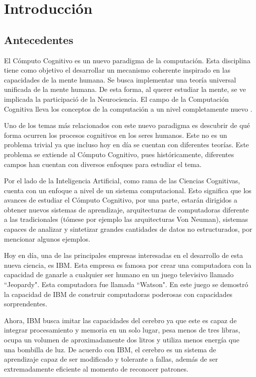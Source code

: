 \chapter{Introducción}
\label{ch:intro}

\section{Antecedentes}
El C\'{o}mputo Cognitivo es un nuevo paradigma de la computaci\'{o}n. Esta disciplina tiene como objetivo el desarrollar un mecanismo coherente inspirado en las capacidades de la mente humana. Se busca implementar una teor\'{i}a universal unificada de la mente humana. De esta forma, al querer estudiar la mente, se ve implicada la participaci\'{o} de la Neurociencia. El campo de la Computaci\'{o}n Cognitiva lleva los conceptos de la computaci\'{o}n a un nivel completamente nuevo \cite{cc}.

Uno de los temas m\'{a}s relacionados con este nuevo paradigma es descubrir de qu\'{e} forma ocurren los procesos cognitivos en los seres humanos. Este no es un problema trivial ya que incluso hoy en d\'{i}a se cuentan con diferentes teor\'{i}as. Este problema se extiende al C\'{o}mputo Cognitivo, pues hist\'{o}ricamente, diferentes campos han cuentan con diversos enfoques para estudiar el tema.

Por el lado de la Inteligencia Artificial, como rama de las Ciencias Cognitivas, cuenta con un enfoque a nivel de un sistema computacional. Esto significa que los avances de estudiar el C\'{o}mputo Cognitivo, por una parte, estar\'{a}n dirigidos a obtener nuevos sistemas de aprendizaje, arquitecturas de computadoras diferente a las tradicionales (t\'{o}mese por ejemplo las arquitecturas Von Neuman), sistemas capaces de analizar y sintetizar grandes cantidades de datos no estructurados, por mencionar algunos ejemplos.

Hoy en d\'{i}a, una de las principales empresas interesadas en el desarrollo de esta nueva ciencia, es IBM. Esta empresa es famosa por crear una computadora con la capacidad de ganarle a cualquier ser humano en un juego televisivo llamado “Jeopardy". Esta computadora fue llamada “Watson". En este juego se demostr\'{o} la capacidad de IBM de construir computadoras poderosas con capacidades sorprendentes. 

Ahora, IBM busca imitar las capacidades del cerebro ya que este es capaz de integrar procesamiento y memoria en un solo lugar, pesa menos de tres libras, ocupa un volumen de aproximadamente dos litros y utiliza menos energ\'{i}a que una bombilla de luz. De acuerdo con IBM, el cerebro es un sistema de aprendizaje capaz de ser modificado y tolerante a fallas, adem\'{a}s de ser extremadamente eficiente al momento de reconocer patrones. 

